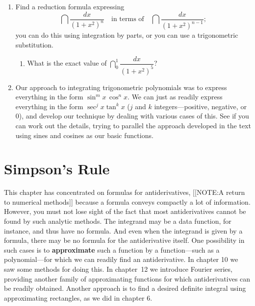 \begin{enumerate}
  \begin{enumerate}
  \item Using the results of part (a), show that
\[
\dfrac{1}{n!}\int_0^t x^n\,e^x\,dx 
   = e^t\left(\dfrac{t^n}{n!} - \dfrac{t^{n-1}}{(n-1)!} 
       +\dfrac{t^{n-2}}{(n-2)!} - \cdots \pm \dfrac{t^2}{2!} 
       \mp t\pm 1\right)\mp 1.
\]


  \item Explain why, for a fixed value of $t$,
\[
\lim_{n\rightarrow\infty} \dfrac{1}{n!}\int_0^t x^n\,e^x\,dx =0.
\]


  \item Prove that
\[
\lim_{n\rightarrow\infty}\left(1-t+\dfrac{t^2}{2!}
    -\dfrac{t^3}{3!}+\dfrac{t^4}{4!}
    -\cdots \pm \dfrac{t^n}{n!}\right)=e^{-t}.
\]


\end{enumerate}
\item Find a reduction formula expressing
\[
\dint \dfrac{dx}{(1+x^2)^n} \quad \text{in terms of} \quad
   \dint \dfrac{dx}{(1+x^2)^{n-1}};
\]
you can do this using integration by parts, or you can use a
trigonometric substitution.\label{1plusx2}


  \begin{enumerate}
  \item What is the exact value of $\dint_0^1 \dfrac{dx}{(1+x^2)^5}$?


\end{enumerate}
\item Our approach to integrating trigonometric polynomials was to
express everything in the form $\sin^m{x}\,\cos^n{x}$.  We can just as
readily express everything in the form $\sec^j{x}\tan^k{x}$ ($j$ and
$k$ integers---positive, negative, or 0), and develop our technique by
dealing with various cases of this.  See if you can work out the
details, trying to parallel the approach developed in the text using
sines and cosines as our basic functions.


\end{enumerate}
\section{Simpson's Rule}
\label{sec:simpsons-rule}

This chapter has concentrated on formulas for antiderivatives, 
[[NOTE:A return to  numerical methods]]	
because a formula conveys compactly a lot of information.  However,
you must not lose sight of the fact that most antiderivatives cannot
be found by such analytic methods.  The integrand may be a data
function, for instance, and thus have no formula.  And even when the
integrand is given by a formula, there may be no formula for the
antiderivative itself.  One possibility in such cases is to {\bf
  approximate} such a function by a function---such as a
polynomial---for which we can readily find an antiderivative.  In
chapter 10 we saw some methods for doing this.  In chapter~12 we
introduce Fourier series, providing another family of approximating
functions for which antiderivatives can be readily obtained. Another
approach is to find a desired definite integral using approximating
rectangles, as we did in chapter 6.

